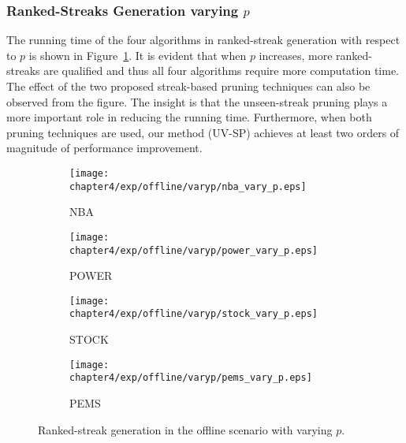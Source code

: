 \subsubsection{Ranked-Streaks Generation varying $p$}
The running time of the four algorithms in ranked-streak generation with respect to $p$ is shown in Figure~\ref{exp:offline_performance_vary_p}. It is evident that when $p$ increases, more ranked-streaks are qualified and thus all four algorithms require more computation time. The effect of the two proposed streak-based pruning techniques can also be observed from the figure. The insight is that the unseen-streak pruning plays a more important role in reducing the running time. Furthermore, when both pruning techniques are used, our method (UV-SP) achieves at least two orders of magnitude of performance improvement.

\begin{figure}[t]
\centering
    \begin{subfigure}[b]{0.45\textwidth}
        \texttt{[image: chapter4/exp/offline/varyp/nba\_vary\_p.eps]}
        \caption{NBA}
    \end{subfigure}
    \begin{subfigure}[b]{0.45\textwidth}
        \texttt{[image: chapter4/exp/offline/varyp/power\_vary\_p.eps]}
        \caption{POWER}
    \end{subfigure}
    \begin{subfigure}[b]{0.45\textwidth}
        \texttt{[image: chapter4/exp/offline/varyp/stock\_vary\_p.eps]}
        \caption{STOCK}
    \end{subfigure}
    \begin{subfigure}[b]{0.45\textwidth}
        \texttt{[image: chapter4/exp/offline/varyp/pems\_vary\_p.eps]}
        \caption{PEMS}
    \end{subfigure}
\caption{Ranked-streak generation in the offline scenario with varying $p$.}
\label{exp:offline_performance_vary_p}
\end{figure}

